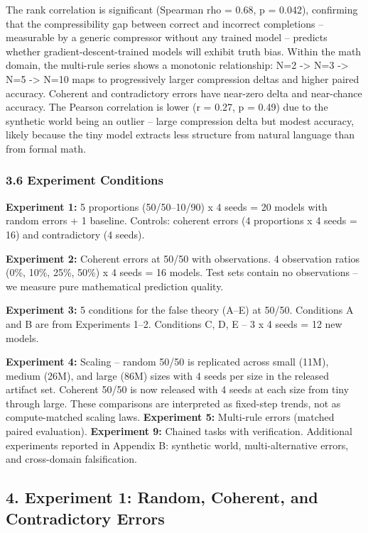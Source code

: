 \documentclass[
  11pt,
]{article}
\begin{document}
The rank correlation is significant (Spearman rho = 0.68, p = 0.042),
confirming that the compressibility gap between correct and incorrect
completions -- measurable by a generic compressor without any trained
model -- predicts whether gradient-descent-trained models will exhibit
truth bias. Within the math domain, the multi-rule series shows a
monotonic relationship: N=2 -\textgreater{} N=3 -\textgreater{} N=5
-\textgreater{} N=10 maps to progressively larger compression deltas and
higher paired accuracy. Coherent and contradictory errors have near-zero
delta and near-chance accuracy. The Pearson correlation is lower (r =
0.27, p = 0.49) due to the synthetic world being an outlier -- large
compression delta but modest accuracy, likely because the tiny model
extracts less structure from natural language than from formal math.

\subsubsection{3.6 Experiment Conditions}\label{experiment-conditions}

\textbf{Experiment 1:} 5 proportions (50/50--10/90) x 4 seeds = 20
models with random errors + 1 baseline. Controls: coherent errors (4
proportions x 4 seeds = 16) and contradictory (4 seeds).

\textbf{Experiment 2:} Coherent errors at 50/50 with observations. 4
observation ratios (0\%, 10\%, 25\%, 50\%) x 4 seeds = 16 models. Test
sets contain no observations -- we measure pure mathematical prediction
quality.

\textbf{Experiment 3:} 5 conditions for the false theory (A--E) at
50/50. Conditions A and B are from Experiments 1--2. Conditions C, D, E
-- 3 x 4 seeds = 12 new models.

\textbf{Experiment 4:} Scaling -- random 50/50 is replicated across
small (11M), medium (26M), and large (86M) sizes with 4 seeds per size
in the released artifact set. Coherent 50/50 is now released with 4
seeds at each size from tiny through large. These comparisons are
interpreted as fixed-step trends, not as compute-matched scaling laws.
\textbf{Experiment 5:} Multi-rule errors (matched paired evaluation).
\textbf{Experiment 9:} Chained tasks with verification. Additional
experiments reported in Appendix B: synthetic world, multi-alternative
errors, and cross-domain falsification.

\subsection{4. Experiment 1: Random, Coherent, and Contradictory
Errors}\label{experiment-1-random-coherent-and-contradictory-errors}
\end{document}
